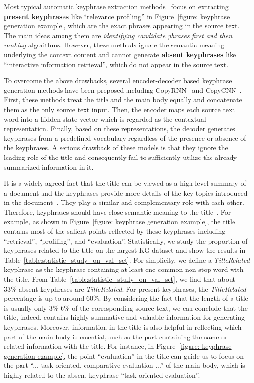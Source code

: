 \documentclass[letterpaper]{article} %
\begin{document}
Most typical automatic keyphrase extraction methods~\cite{witten1999kea,medelyan2009human,mihalcea2004textrank} focus on extracting \textbf{present keyphrases} like ``relevance profiling'' in Figure~\ref{figure: keyphrase generation example}, which are the exact phrases appearing in the source text. The main ideas among them are \textit{identifying candidate phrases first and then ranking} algorithms. However, these methods ignore the semantic meaning underlying the context content and cannot generate \textbf{absent keyphrases} like ``interactive information retrieval'', which do not appear in the source text.


To overcome the above drawbacks, several encoder-decoder based keyphrase generation methods have been proposed including CopyRNN~\cite{meng2017dkg} and CopyCNN~\cite{zhang2017dkg_conv}. First, these methods treat the title and the main body equally and concatenate them as the only source text input. Then, the encoder maps each source text word into a hidden state vector which is regarded as the contextual representation. Finally, based on these representations, the decoder generates keyphrases from a predefined vocabulary regardless of the presence or absence of the keyphrases.
A serious drawback of these models is that they ignore the leading role of the title and consequently fail to sufficiently utilize the already summarized information in it.


It is a widely agreed fact that the title can be viewed as a high-level summary of a document and the keyphrases provide more details of the key topics introduced in the document~\cite{li2010semi_title}. They play a similar and complementary role with each other. Therefore, keyphrases should have close semantic meaning to the title~\cite{li2010semi_title}. For example, as shown in Figure~\ref{figure: keyphrase generation example}, the title contains most of the salient points reflected by these keyphrases including ``retrieval'', ``profiling'', and ``evaluation''. Statistically, we study the proportion of keyphrases related to the title on the largest KG dataset and show the results in Table~\ref{table:statistic_study_on_val_set}. For simplicity, we define a \textit{TitleRelated} keyphrase as the keyphrase containing at least one common non-stop-word with the title. From Table~\ref{table:statistic_study_on_val_set}, we find that about 33\% absent keyphrases are \textit{TitleRelated}. For present keyphrases, the \textit{TitleRelated} percentage is up to around 60\%. By considering the fact that the length of a title is usually only 3\%-6\% of the corresponding source text, we can conclude that the title, indeed, contains highly summative and valuable information for generating keyphrases.
Moreover, information in the title is also helpful in reflecting which part of the main body is essential, such as the part containing the same or related information with the title. For instance, in Figure~\ref{figure: keyphrase generation example}, the point ``evaluation'' in the title can guide us to focus on the part ``... task-oriented, comparative evaluation ...'' of the main body, which is highly related to the absent keyphrase ``task-oriented evaluation''.
\end{document}
